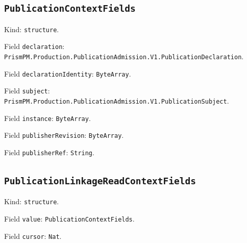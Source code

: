 \documentclass[11pt]{article}
\begin{document}
\subsection*{\texttt{PublicationContextFields}}
\noindent Kind: \texttt{structure}.\par
\noindent Field \texttt{declaration}: \texttt{PrismPM.Production.PublicationAdmission.V1.PublicationDeclaration}.\par
\noindent Field \texttt{declarationIdentity}: \texttt{ByteArray}.\par
\noindent Field \texttt{subject}: \texttt{PrismPM.Production.PublicationAdmission.V1.PublicationSubject}.\par
\noindent Field \texttt{instance}: \texttt{ByteArray}.\par
\noindent Field \texttt{publisherRevision}: \texttt{ByteArray}.\par
\noindent Field \texttt{publisherRef}: \texttt{String}.\par
\subsection*{\texttt{PublicationLinkageReadContextFields}}
\noindent Kind: \texttt{structure}.\par
\noindent Field \texttt{value}: \texttt{PublicationContextFields}.\par
\noindent Field \texttt{cursor}: \texttt{Nat}.\par
\end{document}
